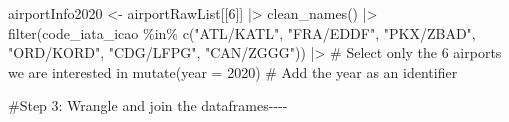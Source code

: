 \documentclass[
  letterpaper,
  DIV=11,
  numbers=noendperiod]{scrartcl}
\newenvironment{Shaded}{\begin{snugshade}}{\end{snugshade}}
\newcommand{\AttributeTok}[1]{\textcolor[rgb]{0.40,0.45,0.13}{#1}}
\newcommand{\CommentTok}[1]{\textcolor[rgb]{0.37,0.37,0.37}{#1}}
\newcommand{\DecValTok}[1]{\textcolor[rgb]{0.68,0.00,0.00}{#1}}
\newcommand{\FunctionTok}[1]{\textcolor[rgb]{0.28,0.35,0.67}{#1}}
\newcommand{\NormalTok}[1]{\textcolor[rgb]{0.00,0.23,0.31}{#1}}
\newcommand{\OtherTok}[1]{\textcolor[rgb]{0.00,0.23,0.31}{#1}}
\newcommand{\SpecialCharTok}[1]{\textcolor[rgb]{0.37,0.37,0.37}{#1}}
\newcommand{\StringTok}[1]{\textcolor[rgb]{0.13,0.47,0.30}{#1}}
\begin{document}
\begin{Shaded}
\begin{Highlighting}[]
\NormalTok{airportInfo2020 }\OtherTok{\textless{}{-}}\NormalTok{ airportRawList[[}\DecValTok{6}\NormalTok{]] }\SpecialCharTok{|\textgreater{}}
  \FunctionTok{clean\_names}\NormalTok{() }\SpecialCharTok{|\textgreater{}}
  \FunctionTok{filter}\NormalTok{(}\StringTok{\textasciigrave{}}\AttributeTok{code\_iata\_icao}\StringTok{\textasciigrave{}} \SpecialCharTok{\%in\%} \FunctionTok{c}\NormalTok{(}\StringTok{"ATL/KATL"}\NormalTok{, }\StringTok{"FRA/EDDF"}\NormalTok{, }\StringTok{"PKX/ZBAD"}\NormalTok{, }
                                 \StringTok{"ORD/KORD"}\NormalTok{, }\StringTok{"CDG/LFPG"}\NormalTok{, }\StringTok{"CAN/ZGGG"}\NormalTok{)) }\SpecialCharTok{|\textgreater{}} 
  \CommentTok{\# Select only the 6 airports we are interested in}
  \FunctionTok{mutate}\NormalTok{(}\AttributeTok{year =} \DecValTok{2020}\NormalTok{) }\CommentTok{\# Add the year as an identifier}
  
\CommentTok{\#Step 3: Wrangle and join the dataframes{-}{-}{-}{-}}


\end{Highlighting}
\end{Shaded}
\end{document}
